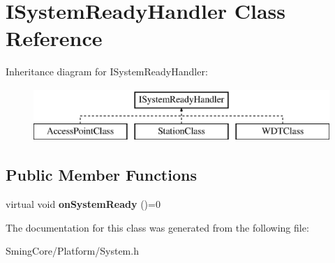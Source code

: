 \hypertarget{class_i_system_ready_handler}{}\section{I\+System\+Ready\+Handler Class Reference}
\label{class_i_system_ready_handler}
Inheritance diagram for I\+System\+Ready\+Handler\+:\begin{figure}[H]
\begin{center}
\leavevmode
\includegraphics[height=2.000000cm]{class_i_system_ready_handler}
\end{center}
\end{figure}
\subsection*{Public Member Functions}
\begin{DoxyCompactItemize}
\item 
\hypertarget{class_i_system_ready_handler_ae52e11b1a352b6d66490ac912bf10be4}{}virtual void {\bfseries on\+System\+Ready} ()=0\label{class_i_system_ready_handler_ae52e11b1a352b6d66490ac912bf10be4}

\end{DoxyCompactItemize}


The documentation for this class was generated from the following file\+:\begin{DoxyCompactItemize}
\item 
Sming\+Core/\+Platform/System.\+h\end{DoxyCompactItemize}
